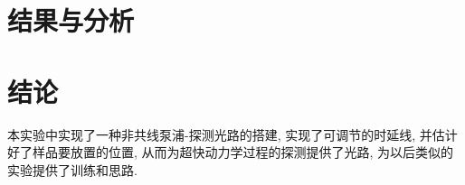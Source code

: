 \documentclass[aps,pre,12pt,preprint,%
	onecolumn,showpacs,showkeys,nofootinbib]{revtex4-2}
\begin{document}
\section{结果与分析}
%	
%	

\section{结论}
本实验中实现了一种非共线泵浦-探测光路的搭建, 实现了可调节的时延线, 并估计好了样品要放置的位置, 从而为超快动力学过程的探测提供了光路, 为以后类似的实验提供了训练和思路.
\end{document}
